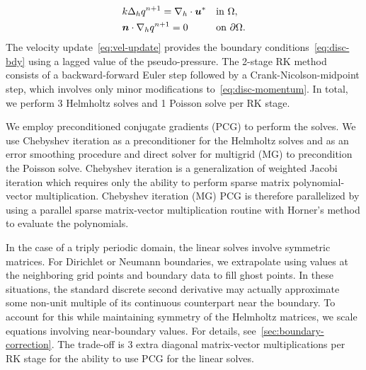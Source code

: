 \begin{equation}
\begin{alignedat}{2}
    &k \laplacian_h q^{n+1} = \div[h]\u^\ast &&\quad \text{in}~\domain, \\
    &\n\cdot\grad[h] q^{n+1} = 0                    &&\quad \text{on}~\partial\domain.
\end{alignedat}
\end{equation}
The velocity update~\eqref{eq:vel-update} provides the boundary conditions~\eqref{eq:disc-bdy} using a lagged
value of the pseudo-pressure. The 2-stage RK method consists of a backward-forward Euler step followed by a
Crank-Nicolson-midpoint step, which involves only minor modifications to~\eqref{eq:disc-momentum}. In total, we
perform 3 Helmholtz solves and 1 Poisson solve per RK stage.

We employ preconditioned conjugate gradients (PCG) to perform the solves. We use Chebyshev iteration as a
preconditioner for the Helmholtz solves and as an error smoothing procedure and direct solver for multigrid (MG)
to precondition the Poisson solve. Chebyshev iteration is a generalization of weighted Jacobi iteration which
requires only the ability to perform sparse matrix polynomial-vector multiplication. Chebyshev iteration (MG) PCG
is therefore parallelized by using a parallel sparse matrix-vector multiplication routine with Horner's method to
evaluate the polynomials.

In the case of a triply periodic domain, the linear solves involve symmetric matrices. For Dirichlet or Neumann
boundaries, we extrapolate using values at the neighboring grid points and boundary data to fill ghost points. In
these situations, the standard discrete second derivative may actually approximate some non-unit multiple of its
continuous counterpart near the boundary. To account for this while maintaining symmetry of the Helmholtz
matrices, we scale equations involving near-boundary values. For details, see~\ref{sec:boundary-correction}. The
trade-off is 3 extra diagonal matrix-vector multiplications per RK stage for the ability to use PCG for the linear
solves.
